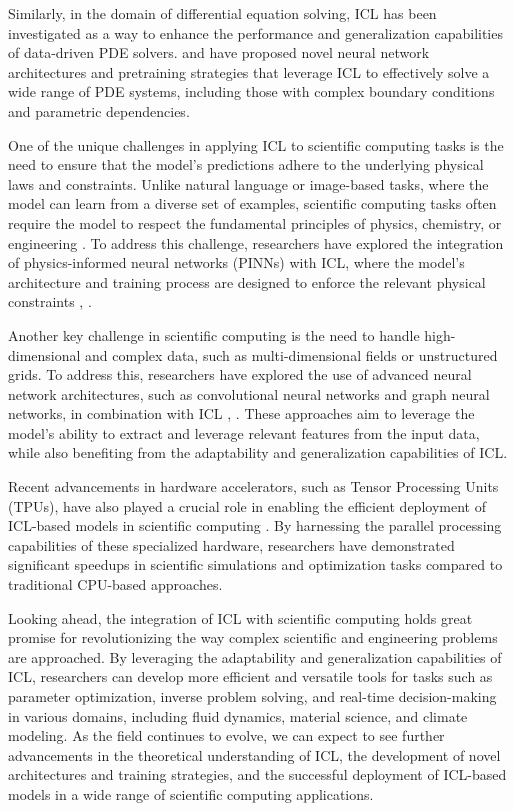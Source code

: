 \documentclass[11pt]{article}
\begin{document}
Similarly, in the domain of differential equation solving, ICL has been investigated as a way to enhance the performance and generalization capabilities of data-driven PDE solvers. \cite{ref262} and \cite{ref263} have proposed novel neural network architectures and pretraining strategies that leverage ICL to effectively solve a wide range of PDE systems, including those with complex boundary conditions and parametric dependencies.

One of the unique challenges in applying ICL to scientific computing tasks is the need to ensure that the model's predictions adhere to the underlying physical laws and constraints. Unlike natural language or image-based tasks, where the model can learn from a diverse set of examples, scientific computing tasks often require the model to respect the fundamental principles of physics, chemistry, or engineering \cite{ref264}. To address this challenge, researchers have explored the integration of physics-informed neural networks (PINNs) with ICL, where the model's architecture and training process are designed to enforce the relevant physical constraints \cite{ref262}, \cite{ref263}.

Another key challenge in scientific computing is the need to handle high-dimensional and complex data, such as multi-dimensional fields or unstructured grids. To address this, researchers have explored the use of advanced neural network architectures, such as convolutional neural networks and graph neural networks, in combination with ICL \cite{ref265}, \cite{ref266}. These approaches aim to leverage the model's ability to extract and leverage relevant features from the input data, while also benefiting from the adaptability and generalization capabilities of ICL.

Recent advancements in hardware accelerators, such as Tensor Processing Units (TPUs), have also played a crucial role in enabling the efficient deployment of ICL-based models in scientific computing \cite{ref267}. By harnessing the parallel processing capabilities of these specialized hardware, researchers have demonstrated significant speedups in scientific simulations and optimization tasks compared to traditional CPU-based approaches.

Looking ahead, the integration of ICL with scientific computing holds great promise for revolutionizing the way complex scientific and engineering problems are approached. By leveraging the adaptability and generalization capabilities of ICL, researchers can develop more efficient and versatile tools for tasks such as parameter optimization, inverse problem solving, and real-time decision-making in various domains, including fluid dynamics, material science, and climate modeling. As the field continues to evolve, we can expect to see further advancements in the theoretical understanding of ICL, the development of novel architectures and training strategies, and the successful deployment of ICL-based models in a wide range of scientific computing applications.
\end{document}
